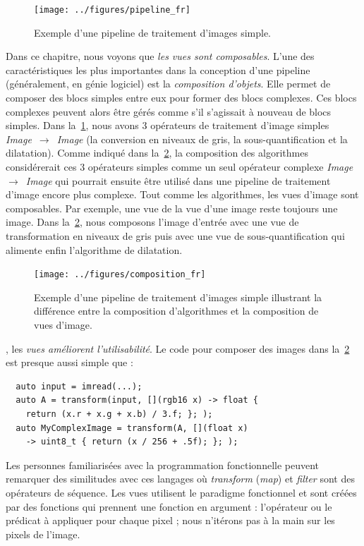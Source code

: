 \begin{figure}[htbp]
  \centering
  \texttt{[image: ../figures/pipeline\_fr]}
  \caption[]{Exemple d'une pipeline de traitement d'images simple.}
  \label{resume:fig:view.pipeline}
\end{figure}

Dans ce chapitre, nous voyons que \emph{les vues sont composables}. L'une des caractéristiques les plus importantes dans
la conception d'une pipeline (généralement, en génie logiciel) est la \emph{composition d'objets}. Elle permet de
composer des blocs simples entre eux pour former des blocs complexes. Ces blocs complexes peuvent alors être gérés comme
s'il s'agissait à nouveau de blocs simples. Dans la~\cref{resume:fig:view.pipeline}, nous avons 3 opérateurs de
traitement d'image simples \emph{Image}~\(\rightarrow\)~\emph{Image} (la conversion en niveaux de gris, la
sous-quantification et la dilatation). Comme indiqué dans la~\cref{resume:fig:view.comp}, la composition des algorithmes
considérerait ces 3 opérateurs simples comme un seul opérateur complexe \emph{Image}~\(\rightarrow\)~\emph{Image} qui
pourrait ensuite être utilisé dans une pipeline de traitement d'image encore plus complexe. Tout comme les algorithmes,
les vues d'image sont composables. Par exemple, une vue de la vue d'une image reste toujours une image. Dans
la~\cref{resume:fig:view.comp}, nous composons l'image d'entrée avec une vue de transformation en niveaux de gris puis
avec une vue de sous-quantification qui alimente enfin l'algorithme de dilatation.

\begin{figure}[htbp]
  \centering
  \texttt{[image: ../figures/composition\_fr]}
  \caption[]{Exemple d'une pipeline de traitement d'images simple illustrant la différence entre la composition
    d'algorithmes et la composition de vues d'image.}
  \label{resume:fig:view.comp}
\end{figure}

, les \emph{vues améliorent l'utilisabilité}. Le code pour composer des images dans
la~\cref{resume:fig:view.comp} est presque aussi simple que :

\begin{verbatim}
  auto input = imread(...);
  auto A = transform(input, [](rgb16 x) -> float {
    return (x.r + x.g + x.b) / 3.f; }; );
  auto MyComplexImage = transform(A, [](float x)
    -> uint8_t { return (x / 256 + .5f); }; );
\end{verbatim}

Les personnes familiarisées avec la programmation fonctionnelle peuvent remarquer des similitudes avec ces langages où
\emph{transform} (\emph{map}) et \emph{filter} sont des opérateurs de séquence. Les vues utilisent le paradigme
fonctionnel et sont créées par des fonctions qui prennent une fonction en argument : l'opérateur ou le prédicat à
appliquer pour chaque pixel ; nous n'itérons pas à la main sur les pixels de l'image.

